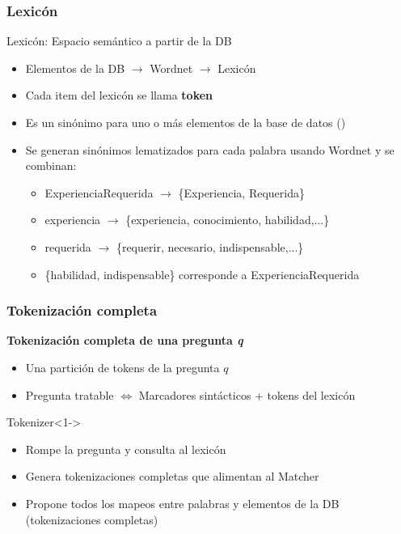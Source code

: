 \begin{frame}[<+->]
 \frametitle{Lexicón}
  \begin{block}{Lexicón: Espacio semántico a partir de la DB}
    \begin{itemize}
      \item Elementos de la DB $\rightarrow$ Wordnet $\rightarrow$ Lexicón
      \item Cada item del lexicón se llama \textbf{token}
      \item Es un sinónimo para uno o más elementos de la base de datos (\textbf{})
    \end{itemize}
  \end{block}  
  \begin{itemize}
      \item Se generan sinónimos lematizados para cada palabra usando Wordnet y se combinan:
      \begin{itemize}
        \item ExperienciaRequerida $\rightarrow$ \{Experiencia, Requerida\}
        \item experiencia $\rightarrow$ \{experiencia, conocimiento, habilidad,...\}
        \item requerida $\rightarrow$ \{requerir, necesario, indispensable,...\}
        \item \{habilidad, indispensable\} corresponde a ExperienciaRequerida
      \end{itemize}
  \end{itemize}
\end{frame}



\begin{frame}[<+->]
\frametitle{Tokenización completa}

\begin{block}{\textbf{Tokenización completa de una pregunta \textit{q}}}
  \begin{itemize}
    \item Una partición de tokens de la pregunta $q$
    \item Pregunta tratable $\Leftrightarrow$ Marcadores sintácticos + tokens del lexicón
   \end{itemize}
\end{block}

\begin{block}{Tokenizer}<1->
      \begin{itemize}
          \item Rompe la pregunta y consulta al lexicón
          \item Genera tokenizaciones completas que alimentan al Matcher
          \item Propone todos los mapeos entre palabras y elementos de la DB (tokenizaciones completas)
      \end{itemize}
    \end{block}
\end{frame}


